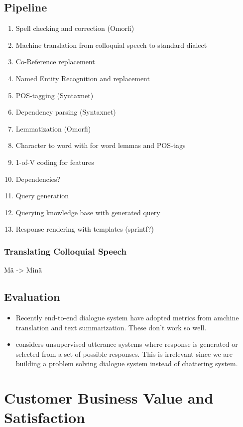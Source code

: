 \documentclass[12pt,a4paper,english
]{tutthesis}
\begin{document}
\section{Pipeline}
\label{se:pipeline}
\begin{enumerate}
\item Spell checking and correction (Omorfi)
\item Machine translation from colloquial speech to standard dialect
\item Co-Reference replacement
\item Named Entity Recognition and replacement
\item POS-tagging (Syntaxnet)
\item Dependency parsing (Syntaxnet)
\item Lemmatization (Omorfi)
\item Character to word with \cite{Ling2015} for word lemmas and POS-tags
\item 1-of-V coding for features
\item Dependencies?
\item Query generation
\item Querying knowledge base with generated query
\item Response rendering with templates (sprintf?)
\end{enumerate}

\subsection{Translating Colloquial Speech}
\label{ss:translating_colloquial_speech}
Mä -> Minä

\section{Evaluation}
\label{se:evaluation}
\begin{itemize}
\item Recently end-to-end dialogue system have adopted metrics from amchine translation and text summarization. These don't work so well. \cite{Liu2016}
\item \cite{Liu2016} considers unsupervised utterance systems where response is generated or selected from a set of possible responses. This is irrelevant since we are building a problem solving dialogue system instead of chattering system.
\end{itemize}


\chapter{Customer Business Value and Satisfaction}
\label{ch:customer_business_value_and_satisfaction}
\end{document}
